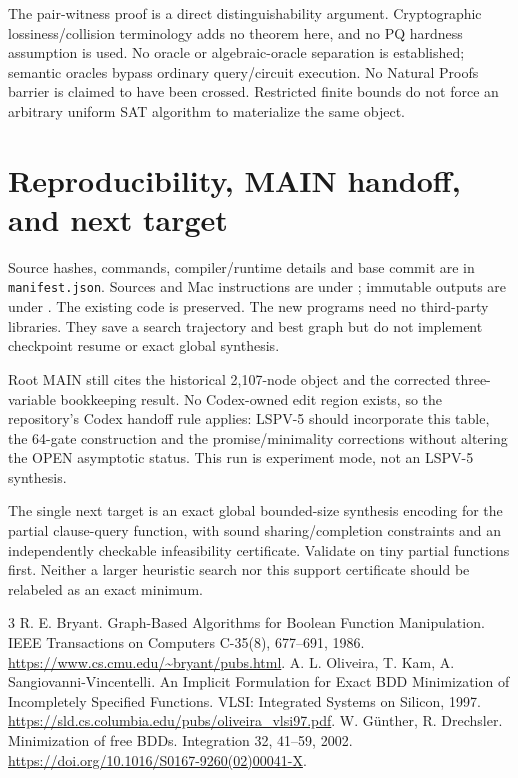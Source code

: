 \documentclass[11pt]{article}
\begin{document}
The pair-witness proof is a direct distinguishability argument. Cryptographic
lossiness/collision terminology adds no theorem here, and no PQ hardness
assumption is used. No oracle or algebraic-oracle separation is established;
semantic oracles bypass ordinary query/circuit execution. No Natural Proofs
barrier is claimed to have been crossed. Restricted finite bounds do not force
an arbitrary uniform SAT algorithm to materialize the same object.

\section*{Reproducibility, MAIN handoff, and next target}
Source hashes, commands, compiler/runtime details and base commit are in
\texttt{manifest.json}. Sources and Mac instructions are under
; immutable outputs are under
.
The existing code is preserved. The new programs need no third-party libraries.
They save a search trajectory and best graph but do not implement checkpoint
resume or exact global synthesis.

Root MAIN still cites the historical 2,107-node object and the corrected
three-variable bookkeeping result. No Codex-owned edit region exists, so the
repository's Codex handoff rule applies: LSPV-5 should incorporate this table,
the 64-gate construction and the promise/minimality corrections without altering
the OPEN asymptotic status. This run is experiment mode, not an LSPV-5 synthesis.

The single next target is an exact global bounded-size synthesis encoding for
the partial clause-query function, with sound sharing/completion constraints and
an independently checkable infeasibility certificate. Validate on tiny partial
functions first. Neither a larger heuristic search nor this support certificate
should be relabeled as an exact minimum.

\begin{thebibliography}{3}
 R. E. Bryant. Graph-Based Algorithms for Boolean Function
Manipulation. IEEE Transactions on Computers C-35(8), 677--691, 1986.
\url{https://www.cs.cmu.edu/~bryant/pubs.html}.
 A. L. Oliveira, T. Kam, A. Sangiovanni-Vincentelli.
An Implicit Formulation for Exact BDD Minimization of Incompletely Specified
Functions. VLSI: Integrated Systems on Silicon, 1997.
\url{https://sld.cs.columbia.edu/pubs/oliveira_vlsi97.pdf}.
 W. G\"unther, R. Drechsler. Minimization of free BDDs.
Integration 32, 41--59, 2002.
\url{https://doi.org/10.1016/S0167-9260(02)00041-X}.
\end{thebibliography}
\end{document}
